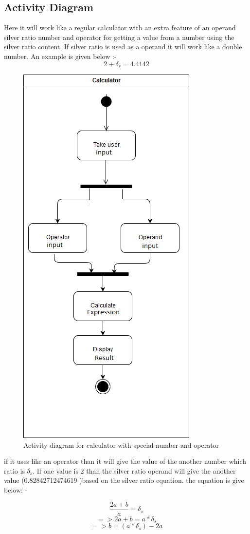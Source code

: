 \documentclass{article}
\begin{document}
\subsection{Activity Diagram}
Here it will work like a regular calculator with an extra feature of an operand silver ratio number and operator for getting a value from a number using the silver ratio content.
If silver ratio is used as a operand it will work like a double number.
An example is given below :- 
$$2+\delta_s = 4.4142$$
\begin{figure}[!htb]
 \centering
  \includegraphics[width=.50\textwidth]{activity}
  \caption{Activity diagram for calculator with special number and operator}
\end{figure}

if it uses like an operator than it will give the value of the another number which ratio is $\delta_s$. If one value is 2 than the silver ratio operand will give the another value (0.82842712474619 )based on the silver ratio equation.
the equation is give below: - \newline

\[ \dfrac{2a + b}{a}  = \delta_s \]
\[ => {2a + b}  = {a *\delta_s} \]
\[ => {b}  = {(a *\delta_s) - 2a} \]

\printbibliography
\end{document}
